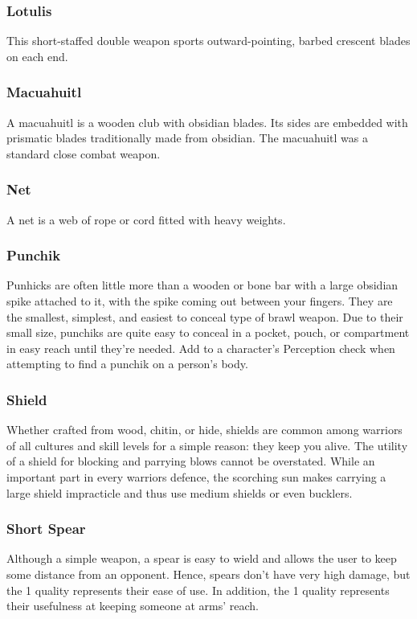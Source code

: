 \begin{multicols}{2}
\subsubsection{Lotulis}
\label{itmmlee:lotulis}
This short-staffed double weapon sports outward-pointing,
barbed crescent blades on each end.

\subsubsection{Macuahuitl}
\label{itmmlee:macuahuitl}
A macuahuitl is a wooden club with obsidian blades. Its sides
are embedded with prismatic blades traditionally made from
obsidian. The macuahuitl was a standard close combat weapon.

\subsubsection{Net}
\label{itmmlee:net}
A net is a web of rope or cord fitted with heavy weights.

\subsubsection{Punchik}
\label{itmmlee:punchik}
Punhicks are often little more than a wooden or bone
bar with a large obsidian spike attached to it, with the spike
coming out between your fingers. They are the smallest, simplest,
and easiest to conceal type of brawl weapon. Due to their
small size, punchiks are quite easy to conceal in a pocket,
pouch, or compartment in easy reach until they're needed. Add
\setback to a character's Perception check when attempting to
find a punchik on a person's body.

\subsubsection{Shield}
\label{itmmlee:shield}
Whether crafted from wood, chitin, or hide, shields are
common among warriors of all cultures and skill levels for
a simple reason: they keep you alive. The utility of a shield
for blocking and parrying blows cannot be overstated. While
an important part in every warriors defence, the scorching sun
makes carrying a large shield impracticle and thus use medium
shields or even bucklers.

\subsubsection{Short Spear}
\label{itmmlee:shortspear}
Although a simple weapon, a spear is easy to wield and
allows the user to keep some distance from an opponent.
Hence, spears don’t have very high damage, but
the  1 quality represents their ease of use.
In addition, the  1 quality represents
their usefulness at keeping someone at arms' reach.


\end{multicols}
